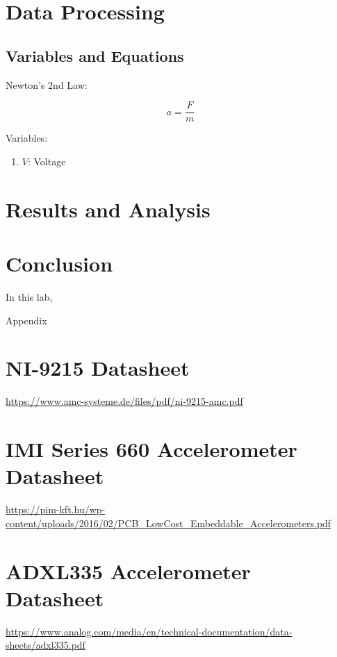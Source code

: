\documentclass{article}
\begin{document}
\hypertarget{datapro}{}
\section{Data Processing}
\subsection{Variables and Equations}  

Newton's 2nd Law:

\begin{equation}
    a = \dfrac{F}{m}
\end{equation}

Variables:
\begin{enumerate}[label = \Roman*.]
    \item \( V \): Voltage
\end{enumerate}

    
\section{Results and Analysis}


\section{Conclusion}
In this lab, 

\newpage
\thispagestyle{empty}  %
\begin{center}
	\vspace*{\fill}
	{\Huge Appendix}
	\vspace*{\fill}
\end{center}

\newpage
\begin{appendices}
\pagestyle{fancy}
\renewcommand{\thefigure}{A\arabic{figure}}
\setcounter{figure}{0}


\newpage

\section*{NI-9215 Datasheet}
\url{https://www.amc-systeme.de/files/pdf/ni-9215-amc.pdf}

\section*{IMI Series 660 Accelerometer Datasheet}
\url{https://pim-kft.hu/wp-content/uploads/2016/02/PCB_LowCost_Embeddable_Accelerometers.pdf}

\section*{ADXL335 Accelerometer Datasheet}
\url{https://www.analog.com/media/en/technical-documentation/data-sheets/adxl335.pdf}

\end{appendices}
\end{document}
